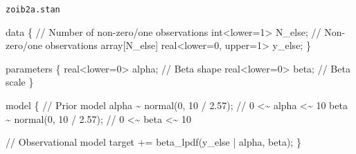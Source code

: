 \documentclass[
  letterpaper,
  DIV=11,
  numbers=noendperiod]{scrartcl}
\newenvironment{Shaded}{\begin{snugshade}}{\end{snugshade}}
\newcommand{\AttributeTok}[1]{\textcolor[rgb]{0.40,0.45,0.13}{#1}}
\newcommand{\CommentTok}[1]{\textcolor[rgb]{0.37,0.37,0.37}{#1}}
\newcommand{\DataTypeTok}[1]{\textcolor[rgb]{0.68,0.00,0.00}{#1}}
\newcommand{\DecValTok}[1]{\textcolor[rgb]{0.68,0.00,0.00}{#1}}
\newcommand{\FloatTok}[1]{\textcolor[rgb]{0.68,0.00,0.00}{#1}}
\newcommand{\FunctionTok}[1]{\textcolor[rgb]{0.28,0.35,0.67}{#1}}
\newcommand{\KeywordTok}[1]{\textcolor[rgb]{0.00,0.23,0.31}{#1}}
\newcommand{\NormalTok}[1]{\textcolor[rgb]{0.00,0.23,0.31}{#1}}
\newcommand{\OtherTok}[1]{\textcolor[rgb]{0.00,0.23,0.31}{#1}}
\newcommand{\SpecialCharTok}[1]{\textcolor[rgb]{0.37,0.37,0.37}{#1}}
\newcommand{\StringTok}[1]{\textcolor[rgb]{0.13,0.47,0.30}{#1}}
\begin{document}
\begin{codelisting}

\caption{\texttt{zoib2a.stan}}

\begin{Shaded}
\begin{Highlighting}[]
\KeywordTok{data}\NormalTok{ \{}
  \CommentTok{// Number of non{-}zero/one observations}
  \DataTypeTok{int}\NormalTok{\textless{}}\KeywordTok{lower}\NormalTok{=}\DecValTok{1}\NormalTok{\textgreater{} N\_else;}
  \CommentTok{// Non{-}zero/one observations}
  \DataTypeTok{array}\NormalTok{[N\_else] }\DataTypeTok{real}\NormalTok{\textless{}}\KeywordTok{lower}\NormalTok{=}\DecValTok{0}\NormalTok{, }\KeywordTok{upper}\NormalTok{=}\DecValTok{1}\NormalTok{\textgreater{} y\_else;}
\NormalTok{\}}

\KeywordTok{parameters}\NormalTok{ \{}
  \DataTypeTok{real}\NormalTok{\textless{}}\KeywordTok{lower}\NormalTok{=}\DecValTok{0}\NormalTok{\textgreater{} alpha; }\CommentTok{// Beta shape}
  \DataTypeTok{real}\NormalTok{\textless{}}\KeywordTok{lower}\NormalTok{=}\DecValTok{0}\NormalTok{\textgreater{}  beta; }\CommentTok{// Beta scale}
\NormalTok{\}}

\KeywordTok{model}\NormalTok{ \{}
  \CommentTok{// Prior model}
\NormalTok{  alpha \textasciitilde{} normal(}\DecValTok{0}\NormalTok{, }\DecValTok{10}\NormalTok{ / }\FloatTok{2.57}\NormalTok{); }\CommentTok{// 0 \textless{}\textasciitilde{} alpha \textless{}\textasciitilde{} 10}
\NormalTok{  beta \textasciitilde{} normal(}\DecValTok{0}\NormalTok{, }\DecValTok{10}\NormalTok{ / }\FloatTok{2.57}\NormalTok{);  }\CommentTok{// 0 \textless{}\textasciitilde{} beta  \textless{}\textasciitilde{} 10}

  \CommentTok{// Observational model}
  \KeywordTok{target +=}\NormalTok{ beta\_lpdf(y\_else | alpha, beta);}
\NormalTok{\}}
\end{Highlighting}
\end{Shaded}

\end{codelisting}

\begin{Shaded}
\end{Shaded}
\end{document}

